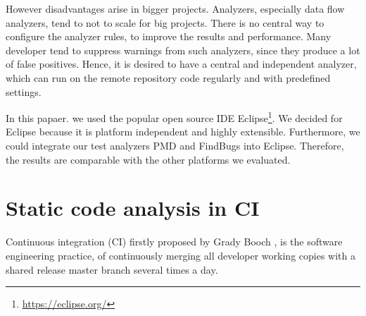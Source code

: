 \documentclass[conference]{IEEEtran}
\begin{document}
However disadvantages arise in bigger projects. Analyzers, especially data flow analyzers, tend to not to scale for big projects. 
There is no central way to configure the analyzer rules, to improve the results and performance.
Many developer tend to suppress warnings from such analyzers, since they produce a lot of false positives.
Hence, it is desired to have a central and independent analyzer, which can run on the remote repository code regularly and with predefined settings.

In this papaer. we used the popular open source IDE Eclipse\footnote{\href{https://eclipse.org/}{https://eclipse.org/}}.
We decided for Eclipse because it is platform independent and highly extensible. Furthermore, we could integrate our test analyzers PMD and FindBugs into Eclipse. Therefore, the results are comparable with the other platforms we evaluated.


\section{Static code analysis in CI}
\label{sec:static_code_analysis_ci}
Continuous integration (CI) firstly proposed by Grady Booch \cite{CI-Definition:Booch:1993}, is the software engineering practice, of continuously merging all developer working copies with a shared release master branch several times a day.
\end{document}
